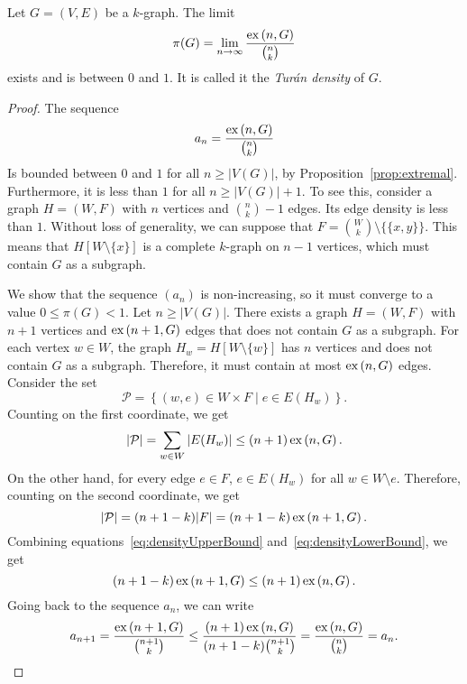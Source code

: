 \begin{theorem}
    Let $G = (V, E)$ be a $k$-graph.
    The limit
    \begin{equation} \label{eq:turan_density}
        \pi(G) = \lim_{n \to \infty} \frac{\text{ex} \left( n, G \right)}{\binom{n}{k}}
    \end{equation}
    exists and is between $0$ and $1$.
    It is called it the \emph{Turán density} of $G$.
    \begin{proof}
        The sequence
        \[
            a_n = \frac{\text{ex} \left( n, G \right)}{\binom{n}{k}}
        \]
        Is bounded between $0$ and $1$ for all $n \geq |V(G)|$, by Proposition~\ref{prop:extremal}.
        Furthermore, it is less than $1$ for all $n \geq |V(G)| + 1$.
        To see this, consider a graph $H = (W, F)$ with $n$ vertices and $\binom{n}{k} - 1$ edges.
        Its edge density is less than $1$.
        Without loss of generality, we can suppose that $F = \binom{W}{k} \setminus \{\{x, y\}\}$.
        This means that $H[W \setminus \{x\}]$ is a complete $k$-graph on $n - 1$ vertices,
        which must contain $G$ as a subgraph.

        We show that the sequence $(a_n)$ is non-increasing, so it must converge to a value $0 \leq \pi(G) < 1$.
        Let $n \geq |V(G)|$.
        There exists a graph $H = (W, F)$ with $n+1$ vertices and $\text{ex} \left( n+1, G \right)$ edges that does not contain
        $G$ as a subgraph.
        For each vertex $w \in W$, the graph $H_w = H[W \setminus \{w\}]$ has $n$ vertices
        and does not contain $G$ as a subgraph.
        Therefore, it must contain at most $\text{ex} \left( n, G \right)$ edges.
        Consider the set
        \[
            \mathcal{P} = \left\{ (w, e) \in W \times F \mid e \in E(H_w) \right\}.
        \]
        Counting on the first coordinate, we get
        \begin{equation} \label{eq:densityUpperBound}
            |\mathcal{P}| = \sum_{w \in W} |E(H_w)| \leq (n+1)\, \text{ex} \left( n, G \right).
        \end{equation}
        On the other hand, for every edge $e \in F$, $e \in E(H_w)$
        for all $w \in W \setminus e$.
        Therefore, counting on the second coordinate, we get
        \begin{equation} \label{eq:densityLowerBound}
            |\mathcal{P}| = (n + 1 - k) |F| = (n + 1 - k)\, \text{ex} \left( n+1, G \right).
        \end{equation}
        Combining equations~\eqref{eq:densityUpperBound} and~\eqref{eq:densityLowerBound},
        we get
        \[
            (n + 1 - k)\, \text{ex} \left( n+1, G \right) \leq (n + 1)\, \text{ex} \left( n, G \right).
        \]
        Going back to the sequence $a_n$, we can write
        \[
            a_{n+1} = \frac{\text{ex} \left( n+1, G \right)}{\binom{n+1}{k}} \leq
            \frac{(n + 1)\, \text{ex} \left( n, G \right)}{(n + 1 - k) \binom{n+1}{k}} =
            \frac{\text{ex} \left( n, G \right)}{\binom{n}{k}} = a_n. \qedhere
        \]
    \end{proof}
\end{theorem}

